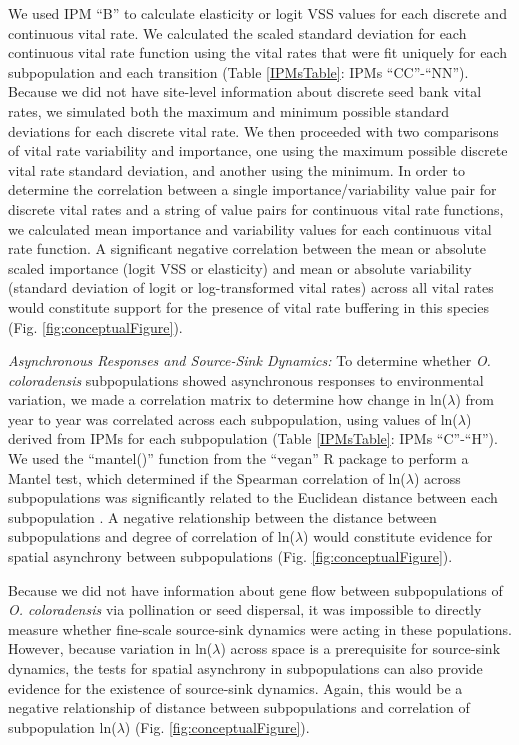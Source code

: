 \documentclass[12pt, letterpaper]{article}
\begin{document}
We used IPM “B” to calculate elasticity or logit VSS values for each discrete and continuous vital rate. We calculated the scaled standard deviation for each continuous vital rate function using the vital rates that were fit uniquely for each subpopulation and each transition (Table \ref{IPMsTable}: IPMs “CC”-“NN”). Because we did not have site-level information about discrete seed bank vital rates, we simulated both the maximum and minimum possible standard deviations for each discrete vital rate. We then proceeded with two comparisons of vital rate variability and importance, one using the maximum possible discrete vital rate standard deviation, and another using the minimum. In order to determine the correlation between a single importance/variability value pair for discrete vital rates and a string of value pairs for continuous vital rate functions, we calculated mean importance and variability values for each continuous vital rate function. A significant negative correlation between the mean or absolute scaled importance (logit VSS or elasticity) and mean or absolute variability (standard deviation of logit or log-transformed vital rates) across all vital rates would constitute support for the presence of vital rate buffering in this species
(Fig. \ref{fig:conceptualFigure}).  

\textit{Asynchronous Responses and Source-Sink Dynamics:} To determine whether \textit{O. coloradensis} subpopulations showed asynchronous responses to environmental variation, we made a correlation matrix to determine how change in ln($\lambda$) from year to year was correlated across each subpopulation, using values of ln($\lambda$) derived from IPMs for each subpopulation (Table \ref{IPMsTable}: IPMs “C”-“H”). We used the “mantel()” function from the “vegan” R package to perform a Mantel test, which determined if the Spearman correlation of ln($\lambda$) across subpopulations was significantly related to the Euclidean distance between each subpopulation \cite{Oksanen2020Vegan:Package}. A negative relationship between the distance between subpopulations and degree of correlation of ln($\lambda$) would constitute evidence for spatial asynchrony between subpopulations (Fig. \ref{fig:conceptualFigure}).   

Because we did not have information about gene flow between subpopulations of \textit{O. coloradensis} via pollination or seed dispersal, it was impossible to directly measure whether fine-scale source-sink dynamics were acting in these populations. However, because variation in ln($\lambda$) across space is a prerequisite for source-sink dynamics, the tests for spatial asynchrony in subpopulations can also provide evidence for the existence of source-sink dynamics. Again, this would be a negative relationship of distance between subpopulations and correlation of subpopulation ln($\lambda$) (Fig. \ref{fig:conceptualFigure}).  
 
\end{document}
